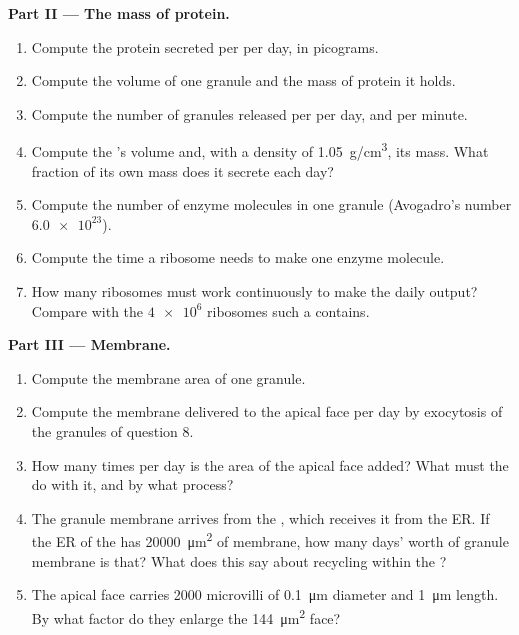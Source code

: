 \begin{problem}
\medskip
\noindent\textbf{Part II --- The mass of protein.}
\begin{enumerate}[resume]
  \item Compute the protein secreted per  per day, in picograms.
  \item Compute the volume of one granule and the mass of protein it
        holds.
  \item Compute the number of granules released per  per day, and
        per minute.
  \item Compute the 's volume and, with a density of
        \qty{1.05}{g/cm^3}, its mass. What fraction of its own mass
        does it secrete each day?
  \item Compute the number of enzyme molecules in one granule
        (Avogadro's number $\num{6.0e23}$).
  \item Compute the time a ribosome needs to make one enzyme molecule.
  \item How many ribosomes must work continuously to make the daily
        output? Compare with the $\num{4e6}$ ribosomes such a 
        contains.
\end{enumerate}

\medskip
\noindent\textbf{Part III --- Membrane.}
\begin{enumerate}[resume]
  \item Compute the membrane area of one granule.
  \item Compute the membrane delivered to the apical face per day by
        exocytosis of the granules of question 8.
  \item How many times per day is the area of the apical face added?
        What must the  do with it, and by what process?
  \item The granule membrane arrives from the , which receives it
        from the ER. If the ER of the  has \qty{20000}{\micro m^2}
        of membrane, how many days' worth of granule membrane is that?
        What does this say about recycling within the ?
  \item The apical face carries \qty{2000}{} microvilli of
        \qty{0.1}{\micro m} diameter and \qty{1}{\micro m} length. By
        what factor do they enlarge the \qty{144}{\micro m^2} face?
\end{enumerate}


\end{problem}
